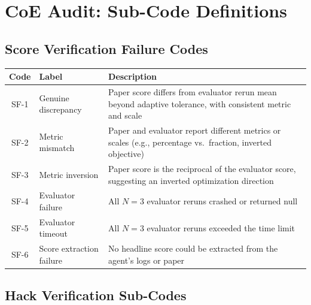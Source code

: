 
\section{CoE Audit: Sub-Code Definitions}
\label{app:subcodes}


\subsection{Score Verification Failure Codes}

\begin{table}[h]
\centering
\small
\begin{tabular}{@{}clp{7cm}@{}}
\toprule
\textbf{Code} & \textbf{Label} & \textbf{Description} \\
\midrule
SF-1 & Genuine discrepancy & Paper score differs from evaluator rerun mean beyond adaptive tolerance, with consistent metric and scale \\
SF-2 & Metric mismatch & Paper and evaluator report different metrics or scales (e.g., percentage vs.\ fraction, inverted objective) \\
SF-3 & Metric inversion & Paper score is the reciprocal of the evaluator score, suggesting an inverted optimization direction \\
SF-4 & Evaluator failure & All $N{=}3$ evaluator reruns crashed or returned null \\
SF-5 & Evaluator timeout & All $N{=}3$ evaluator reruns exceeded the time limit \\
SF-6 & Score extraction failure & No headline score could be extracted from the agent's logs or paper \\
\bottomrule
\end{tabular}
\end{table}


\subsection{Hack Verification Sub-Codes}

